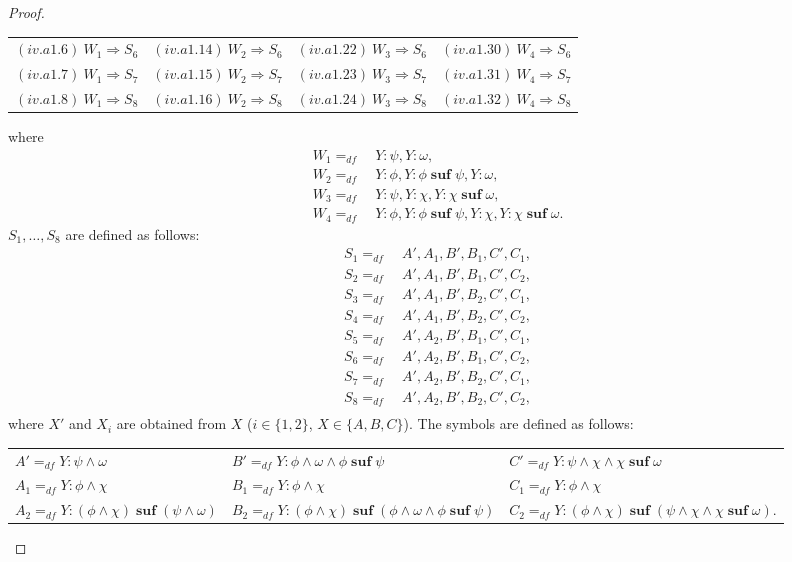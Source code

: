 \documentclass[manuscript,screen]{acmart}
\newcommand{\dddef}[0]{=_{df}}
\DeclareMathOperator{\osuf}{\mathbf{suf}}
\begin{document}
\begin{proof}
\begin{center}
\begin{tabular}{l l l l}
\\
$(iv.a1.6)\ W_1\Rightarrow S_6$
& 
$(iv.a1.14)\ W_2\Rightarrow S_6$
& 
$(iv.a1.22)\ W_3\Rightarrow S_6$
& 
$(iv.a1.30)\ W_4\Rightarrow S_6$
\\
$(iv.a1.7)\ W_1\Rightarrow S_7$
& 
$(iv.a1.15)\ W_2\Rightarrow S_7$
& 
$(iv.a1.23)\ W_3\Rightarrow S_7$
& 
$(iv.a1.31)\ W_4\Rightarrow S_7$
\\
$(iv.a1.8)\ W_1\Rightarrow S_8$
& 
$(iv.a1.16)\ W_2\Rightarrow S_8$
& 
$(iv.a1.24)\ W_3\Rightarrow S_8$
& 
$(iv.a1.32)\ W_4\Rightarrow S_8$
\end{tabular}
\end{center}
where 
$$
\begin{aligned}
W_1 \dddef&\ Y : \psi, Y : \omega, \\
W_2 \dddef&\ Y : \phi, Y : \phi\osuf \psi, Y : \omega, \\
W_3 \dddef&\ Y : \psi, Y : \chi, Y : \chi\osuf \omega, \\
W_4 \dddef&\ Y : \phi, Y : \phi\osuf \psi, Y : \chi, Y : \chi\osuf \omega.
\end{aligned}
$$
$S_1,\ldots,S_8$ are defined as follows: 
$$
\begin{aligned}
S_1\dddef&\ A', A_1, B', B_1, C', C_1, \\
S_2\dddef&\ A', A_1, B', B_1, C', C_2, \\
S_3\dddef&\ A', A_1, B', B_2, C', C_1, \\
S_4\dddef&\ A', A_1, B', B_2, C', C_2, \\
S_5\dddef&\ A', A_2, B', B_1, C', C_1, \\
S_6\dddef&\ A', A_2, B', B_1, C', C_2, \\
S_7\dddef&\ A', A_2, B', B_2, C', C_1, \\
S_8\dddef&\ A', A_2, B', B_2, C', C_2, \\
\end{aligned}
$$
where $X'$ and $X_i$ are obtained from $X$ ($i\in \{1,2\}$, $X\in \{A, B, C\}$). The symbols are defined as follows: 
\begin{center}
\begin{tabular}{l l l}
    $A' \dddef Y : \psi\wedge \omega$
    &
    $B' \dddef Y : \phi\wedge \omega\wedge \phi\osuf \psi$
    &
    $C' \dddef Y : \psi\wedge \chi\wedge \chi\osuf\omega$
    \\
    $A_1\dddef Y : \phi\wedge \chi$
    &
    $B_1\dddef Y : \phi\wedge \chi$
    &
    $C_1\dddef Y : \phi\wedge \chi$
    \\
    $A_2\dddef Y : (\phi\wedge \chi)\osuf (\psi\wedge \omega)$
    &
    $B_2\dddef Y : (\phi\wedge \chi)\osuf(\phi\wedge \omega\wedge \phi\osuf \psi)$
    &
    $C_2\dddef Y : (\phi\wedge \chi)\osuf (\psi\wedge \chi\wedge \chi\osuf\omega)$. 
\end{tabular}
\end{center}


\end{proof}
\end{document}

